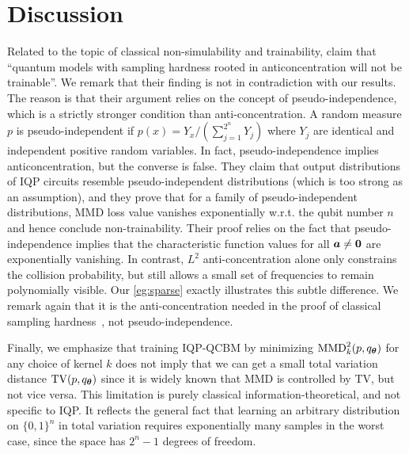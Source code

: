 \documentclass{article}
\theoremstyle{plain}
\theoremstyle{definition}
\theoremstyle{remark}
\newcommand{\MMD}{\ensuremath{\mathrm{MMD}}\xspace}
\begin{document}
\section{Discussion}
\label{sec:discussion}
Related to the topic of classical non-simulability and trainability, \citet{herbst25} claim that ``quantum models with sampling hardness rooted in anticoncentration will not be trainable''. We remark that their finding is not in contradiction with our results. The reason is that their argument relies on the concept of pseudo-independence, which is a strictly stronger condition than anti-concentration. A random measure $p$ is pseudo-independent if $p(x)=Y_x / (\sum_{j=1}^{2^n} Y_j)$ where $Y_j$ are identical and independent positive random variables. In fact, pseudo-independence implies anticoncentration, but the converse is false. They claim that output distributions of IQP circuits resemble pseudo-independent distributions (which is too strong as an assumption), and they prove that for a family of pseudo-independent distributions, MMD loss value vanishes exponentially w.r.t. the qubit number $n$ and hence conclude non-trainability. Their proof relies on the fact that pseudo-independence implies that the characteristic function values for all ${\bm{a}} \neq \bm{0}$ are exponentially vanishing. In contrast, $L^2$ anti-concentration alone only constrains the collision probability, but still allows a small set of frequencies to remain polynomially visible. Our \cref{eg:sparse} exactly illustrates this subtle difference. We remark again that it is the anti-concentration needed in the proof of classical sampling hardness~\cite{Bremner16, Bremner17}, not pseudo-independence. 

Finally, we emphasize that training IQP-QCBM by minimizing $\MMD_k^2(p, q_\vttheta)$ for any choice of kernel $k$ does not imply that we can get a small total variation distance $\operatorname{TV}(p, q_{\bm{\theta}})$ since it is widely known that MMD is controlled by TV, but not vice versa. This limitation is purely classical information-theoretical, and not specific to IQP. It reflects the general fact that learning an arbitrary distribution on $\{0,1\}^n$ in total variation requires exponentially many samples in the worst case, since the space has $2^n-1$ degrees of freedom. 
\end{document}
